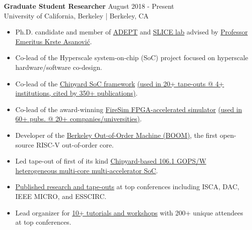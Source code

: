 \documentclass[line]{res}
\begin{document}
\begin{resume}
\textbf{Graduate Student Researcher} \hfill August 2018 - Present
\\
University of California, Berkeley | Berkeley, CA
\\
\vspace{-3mm}
\begin{itemize}
\item Ph.D. candidate and member of \href{https://adept.eecs.berkeley.edu/}{ADEPT} and \href{https://slice.eecs.berkeley.edu/}{SLICE lab} advised by \href{https://people.eecs.berkeley.edu/~krste/}{Professor Emeritus Krste Asanovi\'c}.
\item Co-lead of the Hyperscale system-on-chip (SoC) project focused on hyperscale hardware/software co-design.
\item Co-lead of the \href{https://github.com/ucb-bar/chipyard}{Chipyard SoC framework} \href{https://scholar.google.com/scholar?cites=4549882523608568335&as_sdt=2005&sciodt=0,5&hl=en}{(used in 20+ tape-outs @ 4+ institutions, cited by 350+ publications)}.
\item Co-lead of the award-winning \href{https://fires.im/}{FireSim FPGA-accelerated simulator} \href{https://fires.im/publications/#userpapers}{(used in 60+ pubs. @ 20+ companies/universities)}.
\item Developer of the \href{https://boom-core.org/}{Berkeley Out-of-Order Machine (BOOM)}, the first open-source RISC-V out-of-order core.
\item Led tape-out of first of its kind \href{https://ieeexplore.ieee.org/abstract/document/9567768}{Chipyard-based 106.1 GOPS/W heterogeneous multi-core multi-accelerator SoC}.
\item \href{https://scholar.google.com/citations?user=dsAQJ4cAAAAJ&hl=en}{Published research and tape-outs} at top conferences including ISCA, DAC, IEEE MICRO, and ESSCIRC.
\item Lead organizer for \href{https://fires.im/blog/}{10+ tutorials and workshops} with 200+ unique attendees at top conferences.
\end{itemize}

\vspace{-3mm}


\end{resume}
\end{document}
